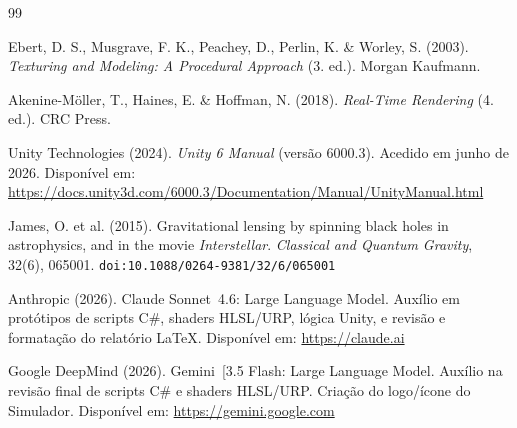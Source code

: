 \documentclass[12pt,a4paper]{article}
\begin{document}
\begin{thebibliography}{99}

Ebert, D. S., Musgrave, F. K., Peachey, D., Perlin, K. \& Worley, S. (2003).
\textit{Texturing and Modeling: A Procedural Approach} (3.\textordfeminine{} ed.).
Morgan Kaufmann.

Akenine-M\"{o}ller, T., Haines, E. \& Hoffman, N. (2018).
\textit{Real-Time Rendering} (4.\textordfeminine{} ed.).
CRC Press.


Unity Technologies (2024).
\textit{Unity 6 Manual} (vers\~{a}o 6000.3).
Acedido em junho de 2026.
Dispon\'{i}vel em: \url{https://docs.unity3d.com/6000.3/Documentation/Manual/UnityManual.html}

James, O. et al. (2015).
Gravitational lensing by spinning black holes in astrophysics, and in the movie \textit{Interstellar}.
\textit{Classical and Quantum Gravity}, 32(6), 065001.
\texttt{doi:10.1088/0264-9381/32/6/065001}

Anthropic (2026).
Claude Sonnet~4.6: Large Language Model.
Aux\'{i}lio em protótipos de scripts C\#, shaders HLSL/URP, l\'{o}gica Unity, e revis\~{a}o e formata\c{c}\~{a}o do relat\'{o}rio \LaTeX{}.
Dispon\'{i}vel em: \url{https://claude.ai}

Google DeepMind (2026).
Gemini~[3.5 Flash: Large Language Model.
Aux\'{i}lio na revisão final de scripts C\# e shaders HLSL/URP. Criação do logo/ícone do Simulador.
Dispon\'{i}vel em: \url{https://gemini.google.com}

\end{thebibliography}
\end{document}
